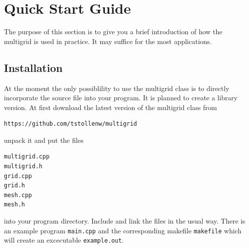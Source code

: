 \chapter{Quick Start Guide}
The purpose of this section is to give you a brief introduction of how the multigrid is used in practice. It may suffice for the most applications.

\section{Installation}
At the moment the only possiblility to use the multigrid class is to directly incorporate the source file into your program. It is planned to create a library version. At first download the latest version of the multigrid class from
\begin{lstlisting}[language=bash]
https://github.com/tstollenw/multigrid
\end{lstlisting}
unpack it and put the files
\begin{lstlisting}
multigrid.cpp
multigrid.h
grid.cpp
grid.h
mesh.cpp
mesh.h
\end{lstlisting}
into your program directory. Include and link the files in the usual way. There is an example program \texttt{main.cpp} and the corresponding makefile \texttt{makefile} which will create an excecutable \texttt{example.out}.

